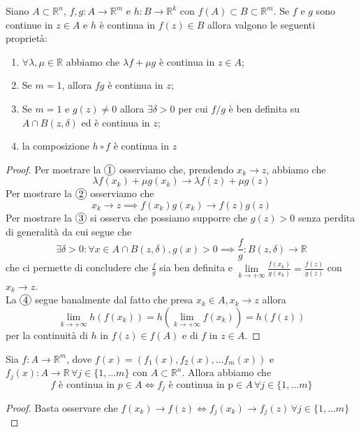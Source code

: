 \documentclass[openany, italian]{book}
\begin{document}
\begin{theorem}[teorema C2]
Siano $A \subset \mathbb{R}^n$, $f, g: A \to \mathbb{R}^m$ e $h: B \to \mathbb{R}^k$ con $f(A) \subset B \subset \mathbb{R}^m$. Se $f$ e $g$ sono continue in $z \in A$ e $h$ è continua in $f(z) \in B$ allora valgono le seguenti proprietà:
\begin{enumerate}[label=\protect\circled{\arabic*}]
	\item $\forall \lambda, \mu \in \mathbb{R}$ abbiamo che $\lambda f + \mu g$ è continua in $z \in A$;
	\item Se $m = 1$, allora $fg$ è continua in $z$;
	\item Se $m=1$ e $g(z) \neq 0$ allora $\exists \delta > 0$ per cui $f/g$ è ben definita su $A \cap B(z, \delta)$ ed è continua in $z$;
	 \item la composizione $h \circ f$ è continua in $z$
\end{enumerate}
\end{theorem}
\begin{proof}
Per mostrare la $\circled{1}$ osserviamo che, prendendo $x_k \to z$, abbiamo che
$$
\lambda f(x_k) + \mu g(x_k) \to \lambda f(z) + \mu g(z)
$$
Per mostrare la $\circled{2}$ osserviamo che
$$
x_k \to z \implies f(x_k)g(x_k) \to f(z)g(z)
$$
Per mostrare la $\circled{3}$ si osserva che possiamo supporre che $g(z) > 0$ senza perdita di generalità da cui segue che
$$
\exists \delta > 0: \forall x \in A \cap B(z, \delta), g(x) > 0 \implies \frac{f}{g}: B(z, \delta) \to \mathbb{R}
$$
che ci permette di concludere che $\frac{f}{g}$ sia ben definita e $\lim\limits_{k \to +\infty} \frac{f(x_k)}{g(x_k)} = \frac{f(z)}{g(z)}$ con $x_k \to z$. \\
La $\circled{4}$ segue banalmente dal fatto che presa $x_k \in A, x_k \to z$ allora
$$
\lim_{k \to +\infty} h(f(x_k)) = h(\lim_{k \to +\infty} f(x_k)) = h(f(z))
$$
per la continuità di $h$ in $f(z) \in f(A)$ e di $f$ in $z \in A$.
\end{proof}
\begin{prop}
Sia $f: A \to \mathbb{R}^m$, dove $f(x) = (f_1(x), f_2(x), \ldots f_m(x))$ e $f_j(x): A \to \mathbb{R} \, \forall j \in \{1, \ldots m\}$ con $A \subset \mathbb{R}^n$. Allora abbiamo che
	$$f \text{ è continua in } p \in A \iff f_j \text{ è continua in p} \in A \, \forall j \in \{1, \ldots m\}$$
\end{prop}
\begin{proof}
Basta osservare che $f(x_k) \to f(z) \iff f_j(x_k) \to f_j(z) \, \forall j \in \{1, \ldots m \}$
\end{proof}
\end{document}
